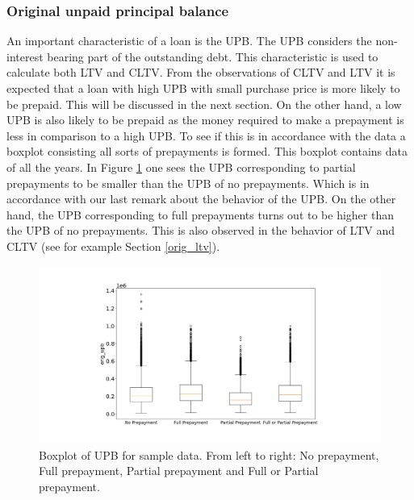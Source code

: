     \subsubsection{Original unpaid principal balance}
        An important characteristic of a loan is the UPB.
        The UPB considers the non-interest bearing part of the 
        outstanding debt.  
        This characteristic 
        is used to calculate both LTV and CLTV. From the 
        observations of CLTV and LTV it is expected that a loan 
        with high UPB with small purchase price is more likely 
        to be prepaid. This will be discussed in the next section. 
        On the other hand, a low UPB is also likely to be 
        prepaid as the money required to make a prepayment is 
        less in comparison to a high UPB. To see if this is in 
        accordance with the data a boxplot consisting all 
        sorts of prepayments is formed. This boxplot contains 
        data of all the years.  In Figure 
        \ref{model_boxplot_UPB} one sees the UPB corresponding 
        to partial prepayments to be smaller than the UPB of no 
        prepayments. Which is in accordance with our last remark 
        about the behavior of the UPB. On the other hand, the 
        UPB corresponding to full prepayments turns out to be 
        higher than the UPB of no prepayments. This is also 
        observed in the behavior of LTV and CLTV (see 
        for example Section \ref{orig_ltv}). 
        \begin{figure}[H]
            \centering
            \includegraphics[width=\linewidth]{Figures/Boxplot_of_upb_[2013, 2014, 2015, 2016, 2017, 2018, 2019, 2020]_.png}
            \caption{
                Boxplot of UPB for sample data. From left to right: 
                No prepayment, Full prepayment, Partial prepayment 
                and Full or Partial prepayment.
                }
            \label{model_boxplot_UPB}
        \end{figure}
